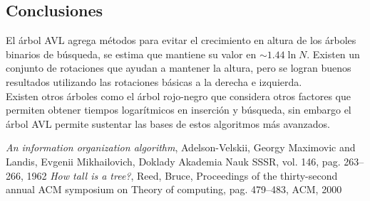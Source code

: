 \documentclass[paper=a4, fontsize=11pt]{scrartcl} %
\numberwithin{equation}{section} %
\numberwithin{figure}{section} %
\numberwithin{table}{section} %
\begin{document}
\subsection{Conclusiones} 
El árbol AVL agrega métodos para evitar el crecimiento en altura de los árboles binarios de búsqueda, se estima que mantiene su valor en $\sim 1.44 \ln N$. Existen un conjunto de rotaciones que ayudan a mantener la altura, pero se logran buenos resultados utilizando las rotaciones básicas a la derecha e izquierda. \\Existen otros árboles como el árbol rojo-negro que considera otros factores que permiten obtener tiempos logarítmicos en inserción y búsqueda, sin embargo el árbol AVL permite sustentar las bases de estos algoritmos más avanzados.



\begin{thebibliography}{2}
  \textit{An information organization algorithm},
  Adelson-Velskii, Georgy Maximovic and Landis, Evgenii Mikhailovich,
  Doklady Akademia Nauk SSSR,
  vol. 146,
  pag. 263--266,
  1962	
  \textit{How tall is a tree?},
  Reed, Bruce,
  Proceedings of the thirty-second annual ACM symposium on Theory of computing,
  pag. 479--483,
  ACM,
  2000
  
\end{thebibliography}
\end{document}
